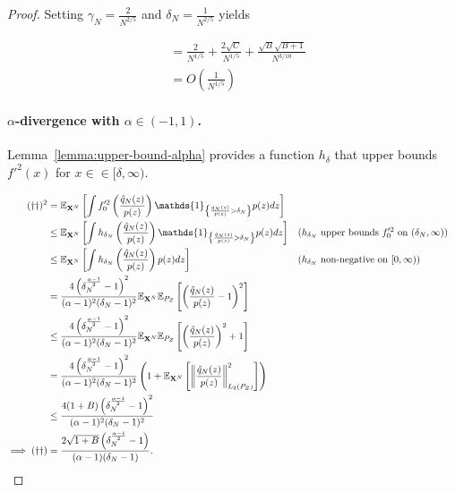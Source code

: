\begin{proof}
Setting $\gamma_N = \frac{2}{N^{2/5}}$ and $\delta_N = \frac{1}{N^{2/5}}$ yields

\begin{align*}
    &= \frac{2}{N^{1/5}}  + \frac{2\sqrt{C}}{N^{1/5}} + \frac{\sqrt{B}\sqrt{B + 1}}{N^{3/10}} \\
    & = O\left(\frac{1}{N^{1/5}} \right)
\end{align*}

\paragraph{$\alpha$-divergence with $\alpha\in(-1,1)$.}
Lemma~\ref{lemma:upper-bound-alpha} provides a function $h_\delta$ that upper bounds $f'^2(x)$ for $x \in \in[\delta, \infty)$.

\begin{align*}
    (\dagger\dagger)^2 
    &= \E_{\XN} \left[\int f_0'^2\left(\frac{\hat{q}_N(z)}{p(z)} \right) \mathds{1}_{\left\lbrace \frac{\hat{q}_N(z)}{p(z)} > \delta_N \right\rbrace} p(z) dz \right]
    \\
    &\leq \E_{\XN} \left[\int h_{\delta_N}\left(\frac{\hat{q}_N(z)}{p(z)} \right) \mathds{1}_{\left\lbrace \frac{\hat{q}_N(z)}{p(z)} > \delta_N \right\rbrace} p(z) dz \right]
    && \text{($h_{\delta_N}$ upper bounds $f_0'^2$ on $(\delta_N, \infty)$)}
    \\
    &\leq \E_{\XN} \left[\int h_{\delta_N}\left(\frac{\hat{q}_N(z)}{p(z)} \right) p(z) dz \right]
    && \text{($h_{\delta_N}$ non-negative on $[0, \infty)$)}
    \\
    &= \frac{4\left(\delta_N^\frac{\alpha-1}{2} - 1\right)^2}{(\alpha - 1)^2 (\delta_N- 1)^2} \E_{\XN}\E_{P_Z} \left[ \left(\frac{\hat{q}_N(z)}{p(z)} - 1 \right)^2 \right] \\
    &\leq \frac{4\left(\delta_N^\frac{\alpha-1}{2} - 1\right)^2}{(\alpha - 1)^2 (\delta_N- 1)^2} \E_{\XN}\E_{P_Z} \left[ \left(\frac{\hat{q}_N(z)}{p(z)}\right)^2 + 1 \right] \\
    &= \frac{4\left(\delta_N^\frac{\alpha-1}{2} - 1\right)^2}{(\alpha - 1)^2 (\delta_N- 1)^2}\left( 1 +  \E_{\XN}\left[ \left\| \frac{\hat{q}_N(z)}{p(z)}\right\|^2_{L_2(P_Z)} \right] \right)\\
    &\leq \frac{4(1+B)\left(\delta_N^\frac{\alpha-1}{2} - 1\right)^2}{(\alpha - 1)^2 (\delta_N- 1)^2} \\
    \implies (\dagger\dagger)&= \frac{2\sqrt{1+B}\left(\delta_N^\frac{\alpha-1}{2} - 1\right)}{(\alpha - 1) (\delta_N- 1)}.
\end{align*}


\end{proof}
